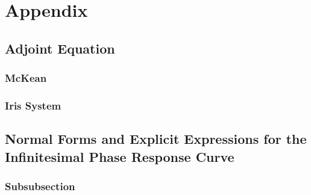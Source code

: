 \documentclass[12pt]{article}
\begin{document}
\section{Appendix}
\subsection{Adjoint Equation}\label{app:adjoint_eq}

\subsubsection{McKean}\label{app:mckean}

\subsubsection{Iris System}\label{app:iris}

\subsection{Normal Forms and Explicit Expressions for the Infinitesimal Phase Response Curve}\label{app:explicit_iprcs}

\subsubsection{Subsubsection}




\newpage

\end{document}
